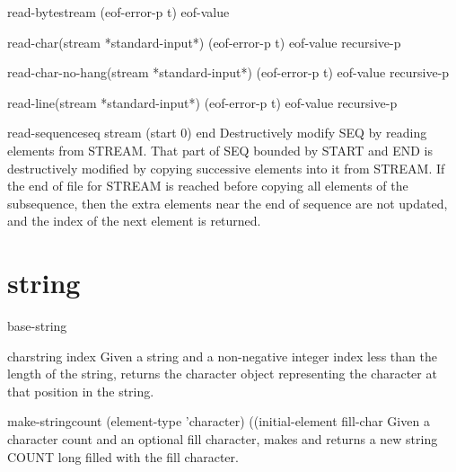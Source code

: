 \begin{function}{read-byte}{stream \op (eof-error-p t) eof-value}{}
  
\end{function}

\begin{function}{read-char}{\op (stream *standard-input*) (eof-error-p t) eof-value recursive-p}{}
  
\end{function}

\begin{function}{read-char-no-hang}{\op (stream *standard-input*) (eof-error-p t) eof-value recursive-p}{}
  
\end{function}

\begin{function}{read-line}{\op (stream *standard-input*) (eof-error-p t) eof-value recursive-p}{}
  
\end{function}

\begin{function}{read-sequence}{seq stream \key (start 0) end}{}
  Destructively modify SEQ by reading elements from STREAM.
  That part of SEQ bounded by START and END is destructively modified by
  copying successive elements into it from STREAM. If the end of file
  for STREAM is reached before copying all elements of the subsequence,
  then the extra elements near the end of sequence are not updated, and
  the index of the next element is returned.
\end{function}

\section{string}

\begin{type}{base-string}{}{}
  
\end{type}

\begin{accessor}{char}{string index}{}
  Given a string and a non-negative integer index less than the length of
  the string, returns the character object representing the character at
  that position in the string.
\end{accessor}

\begin{function}{make-string}{count \key (element-type 'character) ((initial-element fill-char}{}
  Given a character count and an optional fill character, makes and returns a
new string COUNT long filled with the fill character.
\end{function}

